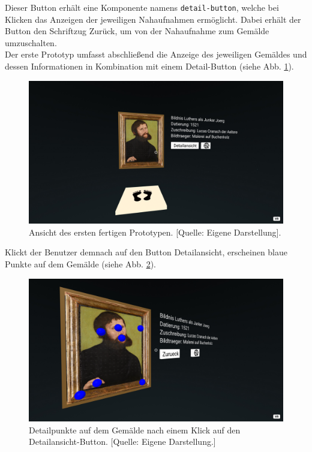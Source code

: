\documentclass[a4paper,12pt,oneside]{article}
\begin{document}
        Dieser Button erhält eine Komponente namens \texttt{detail-button}, welche
        bei Klicken das Anzeigen der jeweiligen Nahaufnahmen ermöglicht.
        Dabei erhält der Button den Schriftzug \glqq Zurück\grqq{}, 
        um von der Nahaufnahme zum Gemälde umzuschalten. \\
        Der erste Prototyp umfasst abschließend die Anzeige des
        jeweiligen Gemäldes und dessen Informationen in Kombination mit
        einem Detail-Button (siehe Abb. \ref{fig:paintings-builder3}).
        \begin{figure}
          \centering
          \includegraphics[scale=0.3]{img/coding/paintings-builder3.png}
          \caption[Ansicht des ersten fertigen Prototypen.]{Ansicht des ersten fertigen Prototypen. [Quelle: Eigene Darstellung].}
          \label{fig:paintings-builder3}
        \end{figure}
        Klickt der Benutzer demnach auf den Button \glqq Detailansicht\grqq{},
        erscheinen blaue Punkte auf dem Gemälde
        (siehe Abb. \ref{fig:paintings-builder4}).
        \begin{figure}
          \centering
          \includegraphics[scale=0.3]{img/coding/paintings-builder4.png}
          \caption[Detailpunkte auf dem Gemälde nach einem Klick auf den \glqq Detailansicht\grqq{}-Button.]{Detailpunkte auf dem Gemälde nach einem Klick auf den \glqq Detailansicht\grqq{}-Button. [Quelle: Eigene Darstellung.]}
          \label{fig:paintings-builder4}
        \end{figure}
\end{document}
